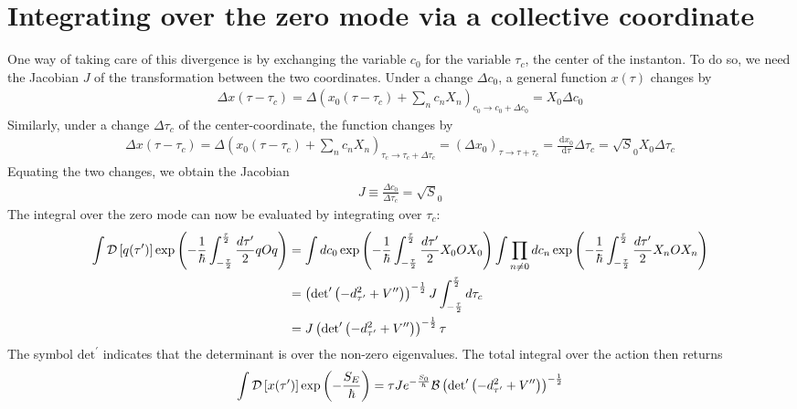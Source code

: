 \documentclass[12pt,onecolumn]{revtex4-2}
\begin{document}
\section{Integrating over the zero mode via a collective coordinate}
One way of taking care of this divergence is by exchanging the variable \(c_0\) for the variable \(\tau_c\), the center of the instanton. To do so, we need the Jacobian \(J\) of the transformation between the two coordinates. Under a change \(\Delta c_0\), a general function \(x(\tau)\) changes by
\begin{equation}\begin{aligned}
	\Delta x(\tau - \tau_c) = \Delta \left( x_0(\tau - \tau_c) + \sum_n c_n X_n \right)_{c_0 \to c_0 + \Delta c_0} = X_0 \Delta c_0
\end{aligned}\end{equation}
Similarly, under a change \(\Delta \tau_c\) of the center-coordinate, the function changes by
\begin{equation}\begin{aligned}
	\Delta x(\tau - \tau_c) = \Delta \left( x_0(\tau - \tau_c) + \sum_n c_n X_n \right)_{\tau_c \to \tau_c + \Delta \tau_c} = \left(\Delta x_0\right)_{\tau \to \tau + \tau_c} = \frac{\:\mathrm{d}x_0}{\:\mathrm{d}\tau}\Delta \tau_c = \sqrt S_0 X_0 \Delta \tau_c
\end{aligned}\end{equation}
Equating the two changes, we obtain the Jacobian 
\begin{equation}\begin{aligned}
J \equiv \frac{\Delta c_0}{\Delta \tau_c} = \sqrt S_0
\end{aligned}\end{equation}
The integral over the zero mode can now be evaluated by integrating over \(\tau_c\):
\begin{equation}\begin{aligned}
	\int \mathcal{D}\left[{q(\tau^\prime)}\right]\exp\left({-\frac{1}{\hbar}\int_{-\frac{\tau}{2}}^{\frac{\tau}{2}} \frac{d\tau^\prime}{2} q O q}\right) &= \int dc_0 \exp\left({-\frac{1}{\hbar}\int_{-\frac{\tau}{2}}^{\frac{\tau}{2}} \frac{d\tau^\prime}{2} X_0 O X_0}\right) \int \prod_{n \neq 0}dc_n \exp\left({-\frac{1}{\hbar}\int_{-\frac{\tau}{2}}^{\frac{\tau}{2}} \frac{d\tau^\prime}{2} X_n O X_n}\right)\\
															     &= \left(\text{det}^\prime\left({-d^2_{\tau^\prime}+V^{\prime\prime}}\right)\right)^{-\frac{1}{2}}J\int_{-\frac{\tau}{2}}^{\frac{\tau}{2}} d\tau_c \\
															     &= J\left(\text{det}^\prime\left({-d^2_{\tau^\prime}+V^{\prime\prime}}\right)\right)^{-\frac{1}{2}} \tau
\end{aligned}\end{equation}
The symbol \(\text{det}^\prime\) indicates that the determinant is over the non-zero eigenvalues. The total integral over the action then returns
\begin{equation}\begin{aligned}
	\int \mathcal{D}\left[{x(\tau^\prime)}\right]\exp\left({-\frac{S_E}{\hbar}}\right) =  \tau J e^{-\frac{S_0}{\hbar}} \mathcal{B} \left(\text{det}^\prime\left({-d^2_{\tau^\prime}+V^{\prime\prime}}\right)\right)^{-\frac{1}{2}}
\end{aligned}\end{equation}
\end{document}
